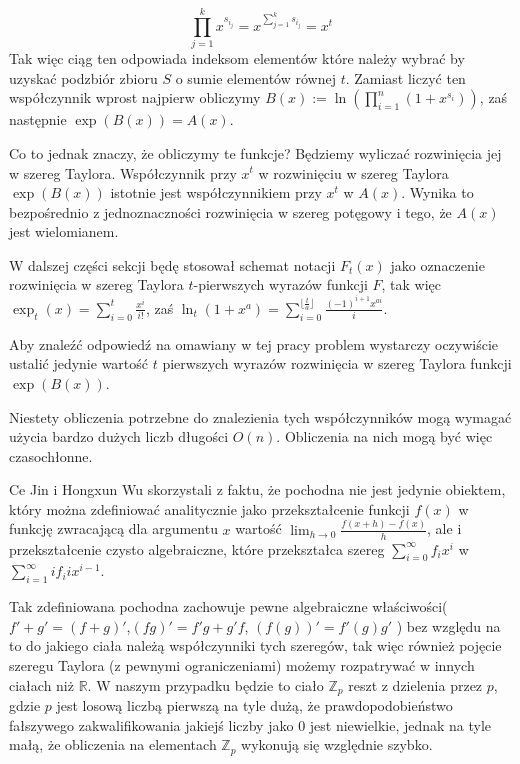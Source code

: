 \documentclass{article}
\begin{document}
$$\prod_{j=1}^{k}x^{s_{i_j}}=x^{\sum_{j=1}^ks_{i_j}}=x^t$$ Tak więc ciąg ten odpowiada indeksom elementów które należy wybrać
by uzyskać podzbiór zbioru $S$ o sumie elementów równej $t$.
Zamiast liczyć ten współczynnik wprost najpierw obliczymy $B(x):=\ln(\prod_{i = 1}^{n}(1+x^{s_i}))$, 
zaś następnie $\exp(B(x)) = A(x)$. 

Co to jednak znaczy, że obliczymy te funkcje? Będziemy wyliczać rozwinięcia jej w szereg Taylora.
Współczynnik przy $x^t$ w rozwinięciu w szereg Taylora $\exp(B(x))$ istotnie jest współczynnikiem
przy $x^t$ w $A(x)$. Wynika to bezpośrednio z jednoznaczności rozwinięcia w szereg potęgowy i tego, że $A(x)$ jest wielomianem. 

W dalszej części sekcji będę stosował schemat notacji $F_t(x)$ jako oznaczenie rozwinięcia w szereg Taylora 
$t$-pierwszych wyrazów funkcji $F$, tak więc $\exp_t(x) = \sum_{i=0}^t\frac{x^i}{i!}$, zaś 
$\ln_t(1+x^a)=\sum_{i=0}^{\lfloor \frac{t}{a} \rfloor}\frac{(-1)^{i+1}x^{ai}}{i}$.

Aby znaleźć odpowiedź na omawiany w tej pracy problem wystarczy oczywiście ustalić jedynie 
wartość $t$ pierwszych wyrazów rozwinięcia w szereg Taylora funkcji $\exp(B(x))$.

Niestety obliczenia potrzebne do znalezienia tych współczynników mogą wymagać użycia bardzo dużych liczb długości $O(n)$. 
Obliczenia na nich mogą być więc czasochłonne. 

Ce Jin i Hongxun Wu skorzystali z faktu, że
pochodna nie jest jedynie obiektem, który można zdefiniować analitycznie jako przekształcenie funkcji 
$f(x)$ w funkcję zwracającą dla argumentu $x$ wartość $\lim_{h \to 0}\frac{f(x+h)-f(x)}{h}$, ale 
i przekształcenie czysto algebraiczne, które przekształca szereg $\sum_{i=0}^{\infty}f_i x^i$ w
$\sum_{i=1}^{\infty}if_{i}ix^{i-1}$. 

Tak zdefiniowana pochodna zachowuje pewne algebraiczne właściwości($f'+g'=(f+g)'$,$(fg)'=f'g+g'f$,
$(f(g))'=f'(g)g'$ ) bez względu na to do jakiego ciała należą współczynniki tych szeregów, tak więc również pojęcie szeregu
Taylora (z pewnymi ograniczeniami) możemy rozpatrywać w innych ciałach niż $\mathbb{R}$. W naszym przypadku będzie to ciało 
$\mathbb{Z}_p$ reszt z dzielenia przez $p$, gdzie $p$ jest losową liczbą pierwszą na tyle dużą, że prawdopodobieństwo fałszywego 
zakwalifikowania
jakiejś liczby jako $0$ jest niewielkie, jednak na tyle małą, że obliczenia na elementach $\mathbb{Z}_p$ wykonują się względnie szybko.

\end{document}
